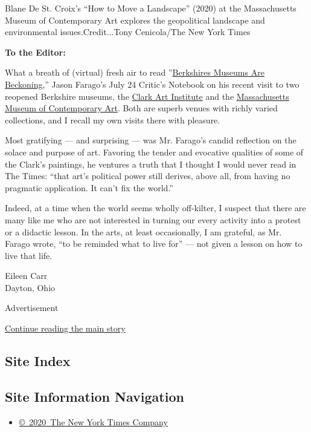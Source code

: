 Blane De St. Croix's ``How to Move a Landscape'' (2020) at the
Massachusetts Museum of Contemporary Art explores the geopolitical
landscape and environmental issues.Credit...Tony Cenicola/The New York
Times

\textbf{To the Editor:}

What a breath of (virtual) fresh air to read
''\href{https://www.nytimes3xbfgragh.onion/2020/07/23/arts/design/massmoca-clark-art-museum.html}{Berkshires
Museums Are Beckoning},'' Jason Farago's July 24 Critic's Notebook on
his recent visit to two reopened Berkshire museums, the
\href{https://www.clarkart.edu/}{Clark Art Institute} and the
\href{https://massmoca.org/}{Massachusetts Museum of Contemporary Art}.
Both are superb venues with richly varied collections, and I recall my
own visits there with pleasure.

Most gratifying --- and surprising --- was Mr. Farago's candid
reflection on the solace and purpose of art. Favoring the tender and
evocative qualities of some of the Clark's paintings, he ventures a
truth that I thought I would never read in The Times: ``that art's
political power still derives, above all, from having no pragmatic
application. It can't fix the world.''

Indeed, at a time when the world seems wholly off-kilter, I suspect that
there are many like me who are not interested in turning our every
activity into a protest or a didactic lesson. In the arts, at least
occasionally, I am grateful, as Mr. Farago wrote, ``to be reminded what
to live for'' --- not given a lesson on how to live that life.

Eileen Carr\\
Dayton, Ohio

Advertisement

\protect\hyperlink{after-bottom}{Continue reading the main story}

\hypertarget{site-index}{%
\subsection{Site Index}\label{site-index}}

\hypertarget{site-information-navigation}{%
\subsection{Site Information
Navigation}\label{site-information-navigation}}

\begin{itemize}
\tightlist
\item
  \href{https://help.nytimes3xbfgragh.onion/hc/en-us/articles/115014792127-Copyright-notice}{©~2020~The
  New York Times Company}
\end{itemize}

